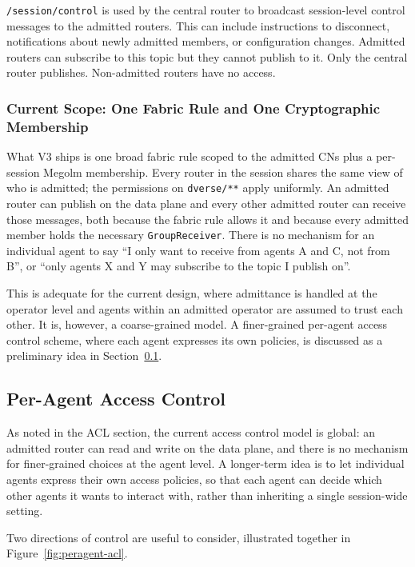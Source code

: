 \documentclass[11pt,a4paper]{article}
\begin{document}
\texttt{/session/control} is used by the central router to broadcast
session-level control messages to the admitted routers. This can
include instructions to disconnect, notifications about newly
admitted members, or configuration changes. Admitted routers can
subscribe to this topic but they cannot publish to it. Only the
central router publishes. Non-admitted routers have no access.

\subsubsection{Current Scope: One Fabric Rule and One Cryptographic Membership}

What V3 ships is one broad fabric rule scoped to the admitted CNs
plus a per-session Megolm membership. Every router in the session
shares the same view of who is admitted; the permissions on
\texttt{dverse/**} apply uniformly. An admitted router can publish
on the data plane and every other admitted router can receive those
messages, both because the fabric rule allows it and because every
admitted member holds the necessary \texttt{GroupReceiver}. There is
no mechanism for an individual agent to say ``I only want to receive
from agents A and C, not from B'', or ``only agents X and Y may
subscribe to the topic I publish on''.

This is adequate for the current design, where admittance is handled
at the operator level and agents within an admitted operator are
assumed to trust each other. It is, however, a coarse-grained model.
A finer-grained per-agent access control scheme, where each agent
expresses its own policies, is discussed as a preliminary idea in
Section~\ref{sec:peragent-acl}.

\subsection{Per-Agent Access Control}
\label{sec:peragent-acl}

As noted in the ACL section, the current access control model is
global: an admitted router can read and write on the data plane, and
there is no mechanism for finer-grained choices at the agent level. A
longer-term idea is to let individual agents express their own access
policies, so that each agent can decide which other agents it wants
to interact with, rather than inheriting a single session-wide setting.

Two directions of control are useful to consider, illustrated
together in Figure~\ref{fig:peragent-acl}.
\end{document}
